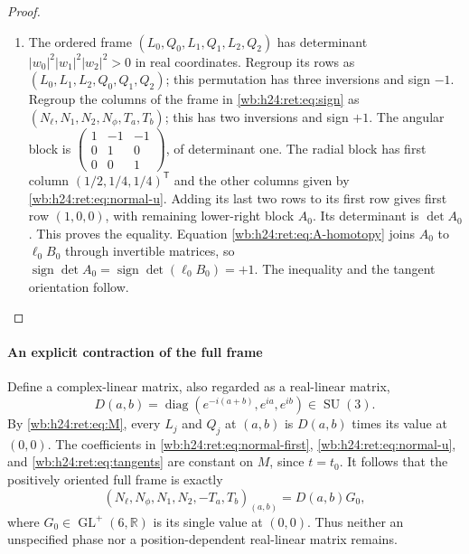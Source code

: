 \begin{proof}
\begin{enumerate}[label=\arabic*.,leftmargin=*]
\item The ordered frame \((L_0,Q_0,L_1,Q_1,L_2,Q_2)\) has determinant
\(|w_0|^2|w_1|^2|w_2|^2>0\) in real coordinates.  Regroup its rows
as \((L_0,L_1,L_2,Q_0,Q_1,Q_2)\); this permutation has three
inversions and sign \(-1\).  Regroup the columns of the frame in
\eqref{wb:h24:ret:eq:sign} as
\((N_\ell,N_1,N_2,N_\phi,T_a,T_b)\); this has two inversions and
sign \(+1\).  The angular block is
\(\left(\begin{smallmatrix}1&-1&-1\\0&1&0\\0&0&1\end{smallmatrix}\right)\),
of determinant one.  The radial block has first column
\((1/2,1/4,1/4)^{\mathsf T}\) and the other columns given by
\eqref{wb:h24:ret:eq:normal-u}.  Adding its last two rows to its first row gives
first row \((1,0,0)\), with remaining lower-right block \(A_0\).
Its determinant is \(\det A_0\).  This proves the equality.
Equation \eqref{wb:h24:ret:eq:A-homotopy} joins \(A_0\) to \(\ell_0B_0\)
through invertible matrices, so
\(\operatorname{sign}\det A_0=\operatorname{sign}\det(\ell_0B_0)=+1\).
The inequality and the tangent orientation follow.
\end{enumerate}
\end{proof}

\paragraph{An explicit contraction of the full frame}

Define a complex-linear matrix, also regarded as a real-linear matrix,
\begin{equation}
 D(a,b)=\operatorname{diag}(e^{-i(a+b)},e^{ia},e^{ib})\in\operatorname{SU}(3).
 \label{wb:h24:ret:eq:D}
\end{equation}
By \eqref{wb:h24:ret:eq:M}, every \(L_j\) and \(Q_j\) at \((a,b)\) is
\(D(a,b)\) times its value at \((0,0)\).  The coefficients in
\eqref{wb:h24:ret:eq:normal-first}, \eqref{wb:h24:ret:eq:normal-u}, and
\eqref{wb:h24:ret:eq:tangents} are constant on \(M\), since \(t=t_0\).
It follows that the positively oriented full frame is exactly
\begin{equation}
 (N_\ell,N_\phi,N_1,N_2,-T_a,T_b)_{(a,b)}
       =D(a,b)G_0,
 \label{wb:h24:ret:eq:full-frame}
\end{equation}
where \(G_0\in\operatorname{GL}^+(6,\mathbb R)\) is its single value at \((0,0)\).
Thus neither an unspecified phase nor a position-dependent
real-linear matrix remains.


